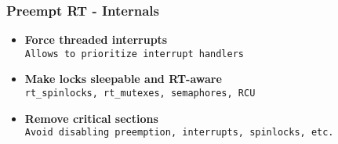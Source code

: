 \begin{frame}
	\frametitle{Preempt RT - Internals}
	\begin{itemize}
		\item \textbf{Force threaded interrupts} \\ {\small{\texttt{Allows to prioritize interrupt handlers}}}
		\item \textbf{Make locks sleepable and RT-aware} \\ {\small{\texttt{rt\_spinlocks, rt\_mutexes, semaphores, RCU}}}
		\item \textbf{Remove critical sections} \\ {\small{\texttt{Avoid disabling preemption, interrupts, spinlocks, etc.}}}
	\end{itemize}
\end{frame}

